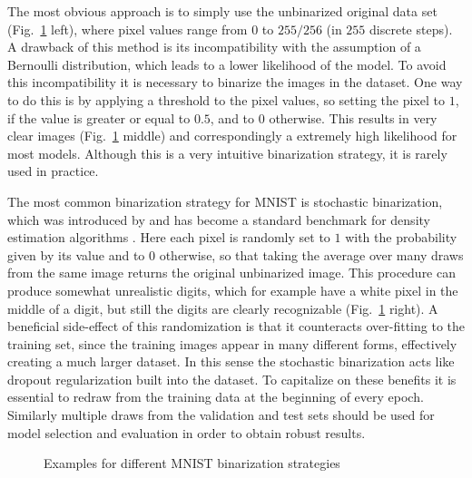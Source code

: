 The most obvious approach is to simply use the unbinarized original data set (Fig.~\ref{fig:MNISTBinarizationComparison} left), where pixel values range from $0$ to $255/256$ (in $255$ discrete steps). A drawback of this method is its incompatibility with the assumption of a Bernoulli distribution, which leads to a lower likelihood of the model.
To avoid this incompatibility it is necessary to binarize the images in the dataset. One way to do this is by applying a threshold to the pixel values, so setting the pixel to $1$, if the value is greater or equal to $0.5$, and to $0$ otherwise. This results in very clear images (Fig.~\ref{fig:MNISTBinarizationComparison} middle) and correspondingly a extremely high likelihood for most models. Although this is a very intuitive binarization strategy, it is rarely used in practice.

The most common binarization strategy for MNIST is stochastic binarization, which was introduced by \parencite{Salakhutdinov2008} and has become a standard benchmark for density estimation algorithms \parencite{Salimans2014,Rezende2014}. Here each pixel is randomly set to $1$ with the probability given by its value and to $0$ otherwise, so that taking the average over many draws from the same image returns the original unbinarized image. This procedure can produce somewhat unrealistic digits, which for example have a white pixel in the middle of a digit, but still the digits are clearly recognizable (Fig.~\ref{fig:MNISTBinarizationComparison} right). A beneficial side-effect of this randomization is that it counteracts over-fitting to the training set, since the training images appear in many different forms, effectively creating a much larger dataset. In this sense the stochastic binarization acts like dropout regularization \parencite{Hinton2012} built into the dataset. To capitalize on these benefits it is essential to redraw from the training data at the beginning of every epoch. Similarly multiple draws from the validation and test sets should be used for model selection and evaluation in order to obtain robust results. 

\begin{figure}
\centering
\caption{Examples for different MNIST binarization strategies}
\label{fig:MNISTBinarizationComparison}
\end{figure}

